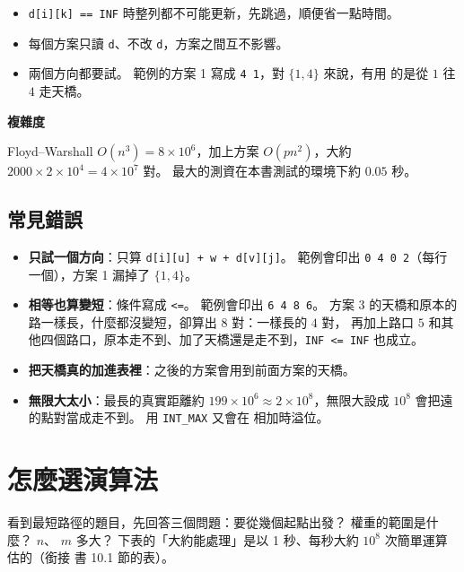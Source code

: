 \begin{itemize}
\item \texttt{d[i][k] == INF} 時整列都不可能更新，先跳過，順便省一點時間。
\item 每個方案只讀 \texttt{d}、不改 \texttt{d}，方案之間互不影響。
\item 兩個方向都要試。 範例的方案 1 寫成 \texttt{4 1}，對 $\{1, 4\}$ 來說，有用
的是從 $1$ 往 $4$ 走天橋。
\end{itemize}

\textbf{複雜度}

Floyd--Warshall $O(n^3) = 8 \times 10^6$，加上方案 $O(pn^2)$，大約 $2000 \times
2 \times 10^4 = 4 \times 10^7$ 對。 最大的測資在本書測試的環境下約 $0.05$ 秒。

\subsection{常見錯誤}

\begin{itemize}
\item \textbf{只試一個方向}：只算 \texttt{d[i][u] + w + d[v][j]}。 範例會印出
\texttt{0 4 0 2}（每行一個），方案 1 漏掉了 $\{1, 4\}$。
\item \textbf{相等也算變短}：條件寫成 \texttt{<=}。 範例會印出 \texttt{6 4 8 6}。
方案 3 的天橋和原本的路一樣長，什麼都沒變短，卻算出 $8$ 對：一樣長的 $4$ 對，
再加上路口 $5$ 和其他四個路口，原本走不到、加了天橋還是走不到，\texttt{INF <= INF}
也成立。
\item \textbf{把天橋真的加進表裡}：之後的方案會用到前面方案的天橋。
\item \textbf{無限大太小}：最長的真實距離約 $199 \times 10^6 \approx 2 \times
10^8$，無限大設成 $10^8$ 會把遠的點對當成走不到。 用 \texttt{INT\_MAX} 又會在
相加時溢位。
\end{itemize}

\section{怎麼選演算法}
\label{sec:sp-choose}

看到最短路徑的題目，先回答三個問題：要從幾個起點出發？ 權重的範圍是什麼？ $n$、
$m$ 多大？ 下表的「大約能處理」是以 1 秒、每秒大約 $10^8$ 次簡單運算估的（銜接
書 10.1 節的表）。

